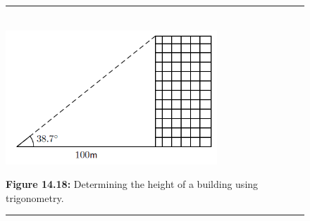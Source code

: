 	\begin{figure}[H] %
    \begin{center}
    \rule[.1in]{\figurerulewidth}{.005in} \\
        \label{m39411*uid26!!!underscore!!!media}\label{m39411*uid26!!!underscore!!!printimage}\includegraphics[width=300px]{col11306.imgs/m39411_MG10C15_012.png} %
        
      \vspace{2pt}
    \vspace{\rubberspace}\par \begin{cnxcaption}
	  \small \textbf{Figure 14.18: }Determining the height of a building using trigonometry.
	\end{cnxcaption}
      
    \vspace{.1in}
    \rule[.1in]{\figurerulewidth}{.005in} \\
        
    \end{center}

 \end{figure}   

    \addtocounter{footnote}{-0}
    
